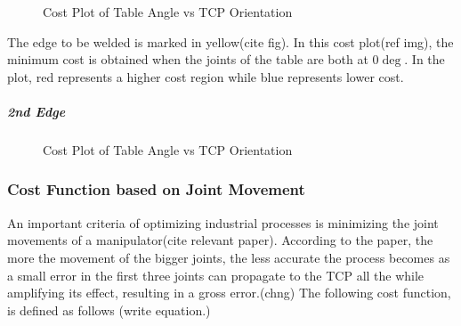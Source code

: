 \begin{figure}[!htbp] %
 \centering
   \caption{Cost Plot of Table Angle vs TCP Orientation}  
\label{fig:img15}
\end{figure}
The edge to be welded is marked in yellow(cite fig). In this cost plot(ref img), the minimum cost is obtained when the joints of the table are both at 0$\deg$. In the plot, red represents a higher cost region while blue represents lower cost.
\subparagraph{2nd Edge}
\begin{figure}[!htbp] %
 \centering
   \caption{Cost Plot of Table Angle vs TCP Orientation}
\label{fig:img16}
\end{figure}

\subsubsection{Cost Function based on Joint Movement}
An important criteria of optimizing industrial processes is minimizing the joint movements of a manipulator(cite relevant paper). According to the paper, the more the movement of the bigger joints, the less accurate the process becomes as a small error in the first three joints can propagate to the TCP all the while amplifying its effect, resulting in a gross error.(chng) The following cost function, is defined as follows (write equation.)
